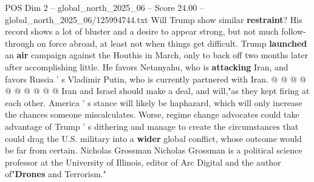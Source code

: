 \begin{textsample}{POS Dim 2 – global\_north\_2025\_06 – Score 24.00 – global\_north\_2025\_06/125994744.txt}
Will Trump show similar \textbf{restraint}?
His record shows a lot of bluster and a desire to appear strong, but not much follow-through on force abroad, at least not when things get difficult.
Trump \textbf{launched} an \textbf{air} campaign against the Houthis in March, only to back off two months later after accomplishing little.
He favors Netanyahu, who is \textbf{attacking} Iran, and favors Russia ' s Vladimir Putin, who is currently partnered with Iran. @ @ @ @ @ @ @ @ @ @ Iran and Israel should make a deal, and will,"as they kept firing at each other.
America ' s stance will likely be haphazard, which will only increase the chances someone miscalculates.
Worse, regime change advocates could take advantage of Trump ' s dithering and manage to create the circumstances that could drag the U.S. military into a \textbf{wider} global conflict, whose outcome would be far from certain.
Nicholas Grossman Nicholas Grossman is a political science professor at the University of Illinois, editor of Arc Digital and the author of"\textbf{Drones} and Terrorism."

\end{textsample}
